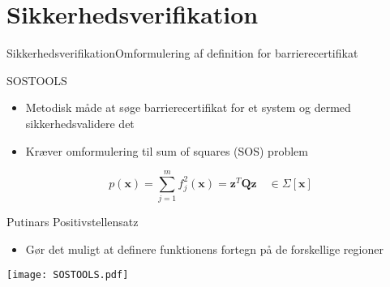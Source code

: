 \section{Sikkerhedsverifikation}
\begin{frame}{Sikkerhedsverifikation}{Omformulering af definition for barrierecertifikat}
\begin{block}{SOSTOOLS}
	\begin{itemize}
		\item Metodisk måde at søge barrierecertifikat for et system og dermed sikkerhedsvalidere det
		\item Kræver omformulering til sum of squares (SOS) problem
	\end{itemize}
\begin{equation*}
p(\mathbf{x})=\sum\limits_{j=1}^{m}f_j^2(\mathbf{x})=\mathbf{z}^T\mathbf{Q}\mathbf{z}\quad \in\Sigma[\mathbf{x}]
\end{equation*}
\end{block}
	\vspace*{-3mm}
\begin{minipage}[b]{0.55\linewidth}
\begin{block}{Putinars Positivstellensatz}
	\begin{itemize}
		\item Gør det muligt at definere funktionens fortegn på de forskellige regioner
	\end{itemize}
\end{block}
\end{minipage}
\hspace{1mm}
\begin{minipage}[b]{0.4\linewidth}
	\vspace{3mm}
	\texttt{[image: SOSTOOLS.pdf]}
\end{minipage}
\end{frame}

